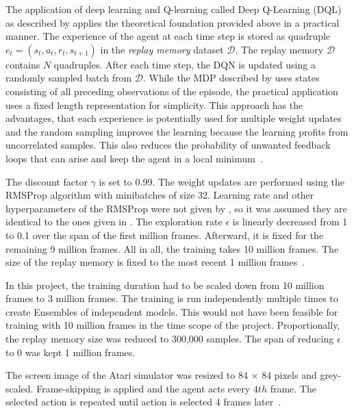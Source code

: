 The application of deep learning and Q-learning called Deep Q-Learning (DQL) as described by \textcite{mnih_playing_2013} applies the theoretical foundation provided above in a practical manner. The experience of the agent at each time step is stored as quadruple $e_{t} = (s_{t}, a_{t}, r_{t}, s_{t+1})$ in the \emph{replay memory} dataset $\mathcal D$. The replay memory $\mathcal D$ contains $N$ quadruples. After each time step, the DQN is updated using a randomly sampled batch from $\mathcal D$. While the MDP described by \textcite{mnih_playing_2013} uses states consisting of all preceding observations of the episode, the practical application uses a fixed length representation for simplicity. This approach has the advantages, that each experience is potentially used for multiple weight updates and the random sampling improves the learning because the learning profits from uncorrelated samples. This  also reduces the probability of unwanted feedback loops that can arise and keep the agent in a local minimum~\parencite{mnih_playing_2013}.

The discount factor $\gamma$  is set to 0.99. The weight updates are performed using the RMSProp algorithm with minibatches of size 32. Learning rate and other hyperparameters of the RMSProp were not given by \textcite{mnih_playing_2013}, so it was assumed they are identical to the ones given in \textcite{mnih_human-level_2015}. The exploration rate $\epsilon$ is linearly decreased from 1 to 0.1 over the span of the first million frames. Afterward, it is fixed for the remaining 9 million frames. All in all, the training takes 10 million frames. The size of the replay memory is fixed to the most recent 1 million frames~\parencite{mnih_playing_2013}.

In this project, the training duration had to be scaled down from 10 million frames to 3 million frames. The training is run independently multiple times to create Ensembles of independent models. This would not have been feasible for training with 10 million frames in the time scope of the project. Proportionally, the replay memory size was  reduced to 300,000 samples. The span of reducing $\epsilon$ to 0 was kept 1 million frames.

The screen image of the Atari simulator was resized to 84 $\times$ 84 pixels and grey-scaled. Frame-skipping is applied and the agent acts every $4th$ frame. The selected action is repeated until action is selected 4 frames later~\parencite{mnih_playing_2013}.

